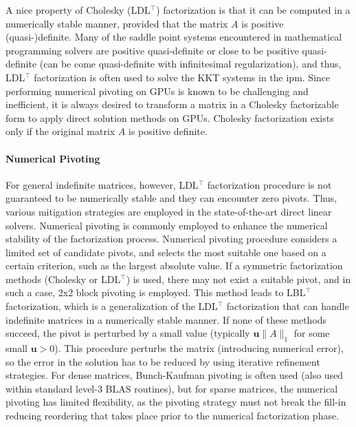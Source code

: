 \documentclass{article}
\begin{document}
A nice property of Cholesky (LDL$^\top$) factorization is that it can be computed in a numerically stable manner, provided that the matrix $A$ is positive (quasi-)definite.
Many of the saddle point systems encountered in mathematical programming solvers are positive quasi-definite or close to be positive quasi-definite (can be come quasi-definite with infinitesimal regularization), and thus, LDL$^\top$ factorization is often used to solve the KKT systems in the \gls*{ipm}.
Since performing numerical pivoting on GPUs is known to be challenging and inefficient, it is always desired to transform a matrix in a Cholesky factorizable form to apply direct solution methods on GPUs.
Cholesky factorization exists only if the original matrix $A$ is positive definite.



\paragraph{Numerical Pivoting}
For general indefinite matrices, however, LDL$^\top$ factorization procedure is not guaranteed to be numerically stable and they can encounter zero pivots.
Thus, various mitigation strategies are employed in the state-of-the-art direct linear solvers.
Numerical pivoting is commonly employed to enhance the numerical stability of the factorization process. Numerical pivoting procedure considers a limited set of candidate pivots, and selects the most suitable one based on a certain criterion, such as the largest absolute value. If a symmetric factorization methods (Cholesky or LDL$^\top$) is used, there may not exist a suitable pivot, and in such a case, 2x2 block pivoting is employed. This method leads to LBL$^\top$ factorization, which is a generalization of the LDL$^\top$ factorization that can handle indefinite matrices in a numerically stable manner. If none of these methods succeed, the pivot is perturbed by a small value (typically $\mathbf{u}\|A\|_1$ for some small $\mathbf{u} > 0$). This procedure perturbs the matrix (introducing numerical error), so the error in the solution has to be reduced by using iterative refinement strategies. For dense matrices, Bunch-Kaufman pivoting is often used (also used within standard level-3 BLAS routines), but for sparse matrices, the numerical pivoting has limited flexibility, as the pivoting strategy must not break the fill-in reducing reordering that takes place prior to the numerical factorization phase.
\end{document}
